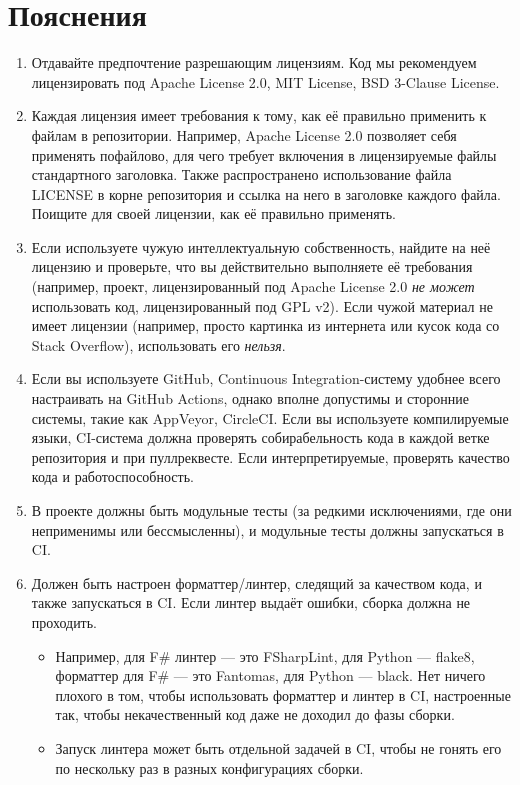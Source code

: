 \documentclass[a5paper]{article}
\begin{document}
\section*{Пояснения}

\begin{enumerate}
    \item Отдавайте предпочтение разрешающим лицензиям. Код мы рекомендуем лицензировать под Apache License 2.0, MIT License, BSD 3-Clause License.
    \item Каждая лицензия имеет требования к тому, как её правильно применить к файлам в репозитории. Например, Apache License 2.0 позволяет себя применять пофайлово, для чего требует включения в лицензируемые файлы стандартного заголовка. Также распространено использование файла LICENSE в корне репозитория и ссылка на него в заголовке каждого файла. Поищите для своей лицензии, как её правильно применять.
    \item Если используете чужую интеллектуальную собственность, найдите на неё лицензию и проверьте, что вы действительно выполняете её требования (например, проект, лицензированный под Apache License 2.0 \emph{не может} использовать код, лицензированный под GPL v2). Если чужой материал не имеет лицензии (например, просто картинка из интернета или кусок кода со Stack Overflow), использовать его \emph{нельзя}.
    \item Если вы используете GitHub, Continuous Integration-систему удобнее всего настраивать на GitHub Actions, однако вполне допустимы и сторонние системы, такие как AppVeyor, CircleCI. Если вы используете компилируемые языки, CI-система должна проверять собирабельность кода в каждой ветке репозитория и при пуллреквесте. Если интерпретируемые, проверять качество кода и работоспособность.
    \item В проекте должны быть модульные тесты (за редкими исключениями, где они неприменимы или бессмысленны), и модульные тесты должны запускаться в CI.
    \item Должен быть настроен форматтер/линтер, следящий за качеством кода, и также запускаться в CI. Если линтер выдаёт ошибки, сборка должна не проходить.
    \begin{itemize}
        \item Например, для F\# линтер --- это FSharpLint, для Python --- flake8, форматтер для F\# --- это Fantomas, для Python --- black. Нет ничего плохого в том, чтобы использовать форматтер и линтер в CI, настроенные так, чтобы некачественный код даже не доходил до фазы сборки.
        \item Запуск линтера может быть отдельной задачей в CI, чтобы не гонять его по нескольку раз в разных конфигурациях сборки.

\end{itemize}
\end{enumerate}
\end{document}
